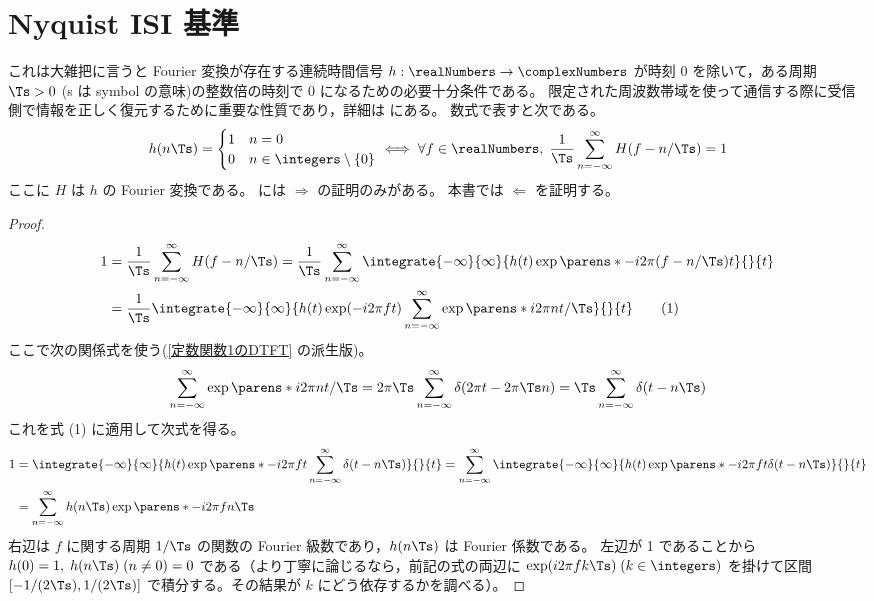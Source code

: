     \section{Nyquist ISI 基準}
        これは大雑把に言うと Fourier 変換が存在する連続時間信号 $h:\realNumbers\to\complexNumbers$ が時刻 0 を除いて，ある周期 $\Ts>0$ (s は symbol の意味)の整数倍の時刻で 0 になるための必要十分条件である。
        限定された周波数帯域を使って通信する際に受信側で情報を正しく復元するために重要な性質であり，詳細は \cite{Nyquist_ISI_crit} にある。
        数式で表すと次である。
        \[
            h(n\Ts) = \begin{cases}
                1 & n=0 \\
                0 & n\in\integers\setminus\{0\}
            \end{cases}
            \iff \forall f\in\realNumbers,\;\frac{1}{\Ts}\sum_{n=-\infty}^\infty H(f-n/\Ts) = 1
        \]
        ここに $H$ は $h$ の Fourier 変換である。
        \cite{Nyquist_ISI_crit} には $\Rightarrow$ の証明のみがある。
        本書では $\Leftarrow$ を証明する。
        \begin{proof}
            \begin{align*}
                1 &= \frac{1}{\Ts}\sum_{n=-\infty}^\infty H(f-n/\Ts) = \frac{1}{\Ts}\sum_{n=-\infty}^\infty\integrate{-\infty}{\infty}{h(t)\exp\parens*{-i2\pi(f-n/\Ts)t}}{}{t} \\
                &= \frac{1}{\Ts}\integrate{-\infty}{\infty}{h(t)\exp(-i2\pi ft)\sum_{n=-\infty}^\infty\exp\parens*{i2\pi nt/\Ts}}{}{t} \tag{1}
            \end{align*}
            ここで次の関係式を使う(\ref{定数関数1のDTFT} の派生版)。
            \[ \sum_{n=-\infty}^\infty\exp\parens*{i2\pi nt/\Ts} = 2\pi\Ts\sum_{n=-\infty}^\infty\delta(2\pi t-2\pi\Ts n) = \Ts\sum_{n=-\infty}^\infty\delta(t-n\Ts) \]
            これを式 (1) に適用して次式を得る。
            \begin{align*}
                1 &= \integrate{-\infty}{\infty}{h(t)\exp\parens*{-i2\pi ft}\sum_{n=-\infty}^\infty\delta(t-n\Ts)}{}{t} = \sum_{n=-\infty}^\infty\integrate{-\infty}{\infty}{h(t)\exp\parens*{-i2\pi ft}\delta(t-n\Ts)}{}{t} \\
                &= \sum_{n=-\infty}^\infty h(n\Ts)\exp\parens*{-i2\pi fn\Ts}
            \end{align*}
            右辺は $f$ に関する周期 $1/\Ts$ の関数の Fourier 級数であり，$h(n\Ts)$ は Fourier 係数である。
            左辺が 1 であることから $h(0) = 1,\;h(n\Ts)\;(n\neq 0) = 0$ である（より丁寧に論じるなら，前記の式の両辺に $\exp(i2\pi fk\Ts)\;(k\in\integers)$ を掛けて区間 $[-1/(2\Ts),1/(2\Ts)]$ で積分する。その結果が $k$ にどう依存するかを調べる）。
        \end{proof}
